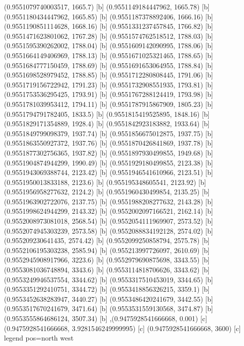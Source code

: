 {{{(0.9551079740003517, 1665.7) [b] 
(0.9551149184447962, 1665.78) [b] 
(0.9551180434447962, 1665.85) [b] 
(0.9551187378892406, 1666.16) [b] 
(0.9551190851114628, 1668.16) [b] 
(0.9551331237457845, 1766.82) [b] 
(0.9551471623801062, 1767.28) [b] 
(0.9551574762518512, 1788.03) [b] 
(0.9551595390262002, 1788.04) [b] 
(0.9551609142090995, 1788.06) [b] 
(0.9551664149406969, 1788.13) [b] 
(0.9551671025321465, 1788.65) [b] 
(0.9551684777150459, 1788.69) [b] 
(0.9551691653064955, 1788.84) [b] 
(0.9551698528979452, 1788.85) [b] 
(0.9551712280808445, 1791.06) [b] 
(0.9551719156722942, 1791.23) [b] 
(0.9551732908551935, 1793.81) [b] 
(0.9551753536295425, 1793.91) [b] 
(0.9551767288124419, 1793.98) [b] 
(0.9551781039953412, 1794.11) [b] 
(0.9551787915867909, 1805.23) [b] 
(0.9551794791782405, 1833.5) [b] 
(0.9551815419525895, 1848.16) [b] 
(0.9551829171354889, 1928.4) [b] 
(0.9551842923183882, 1933.64) [b] 
(0.9551849799098379, 1937.74) [b] 
(0.9551856675012875, 1937.75) [b] 
(0.9551863550927372, 1937.76) [b] 
(0.9551870426841869, 1937.78) [b] 
(0.9551877302756365, 1937.82) [b] 
(0.9551897930499855, 1949.68) [b] 
(0.9551904874944299, 1990.49) [b] 
(0.9551929180499855, 2123.38) [b] 
(0.9551943069388744, 2123.42) [b] 
(0.9551946541610966, 2123.51) [b] 
(0.9551950013833188, 2123.6) [b] 
(0.955195348605541, 2123.92) [b] 
(0.9551956958277632, 2124.2) [b] 
(0.9551960430499854, 2135.25) [b] 
(0.9551963902722076, 2137.75) [b] 
(0.9551988208277632, 2143.28) [b] 
(0.9551998624944299, 2143.32) [b] 
(0.9552002097166521, 2162.14) [b] 
(0.9552008973081018, 2568.54) [b] 
(0.9552054111969907, 2573.52) [b] 
(0.9552074945303239, 2573.58) [b] 
(0.9552088834192128, 2574.02) [b] 
(0.955209230641435, 2574.42) [b] 
(0.9552099250858794, 2575.78) [b] 
(0.9552106195303238, 2585.94) [b] 
(0.955213997726097, 2610.69) [b] 
(0.9552945908917966, 3223.6) [b] 
(0.9552979690875698, 3343.55) [b] 
(0.9553081036748894, 3343.6) [b] 
(0.9553114818706626, 3343.62) [b] 
(0.9553249946537554, 3344.62) [b] 
(0.9553317510453019, 3344.65) [b] 
(0.9553351292410751, 3344.72) [b] 
(0.9553418856326215, 3359.1) [b] 
(0.9553452638283947, 3440.27) [b] 
(0.9553486420241679, 3442.55) [b] 
(0.9553517670241679, 3471.64) [b] 
(0.9553531559130568, 3474.87) [b] 
(0.9553555864686124, 3507.34) [b] 
},{(0.9475928541666668, 0.001) [c] 
(0.9475928541666668, 3.9281546249999995) [c] 
(0.9475928541666668, 3600) [c] 
}}}{legend pos=north west}